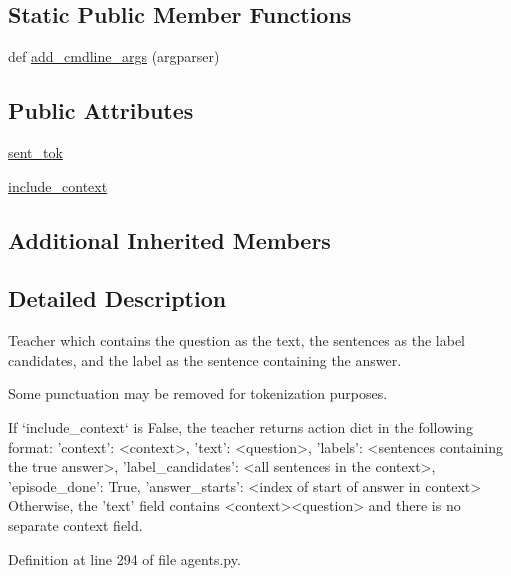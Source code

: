 \subsection*{Static Public Member Functions}
\begin{DoxyCompactItemize}
\item 
def \hyperlink{classparlai_1_1tasks_1_1squad_1_1agents_1_1FulldocsentenceTeacher_af4fae24533376a66d54c771b6c8d06b7}{add\+\_\+cmdline\+\_\+args} (argparser)
\end{DoxyCompactItemize}
\subsection*{Public Attributes}
\begin{DoxyCompactItemize}
\item 
\hyperlink{classparlai_1_1tasks_1_1squad_1_1agents_1_1FulldocsentenceTeacher_a3ad4365c2ebc8896e90e8b478eeb68ed}{sent\+\_\+tok}
\item 
\hyperlink{classparlai_1_1tasks_1_1squad_1_1agents_1_1FulldocsentenceTeacher_a1861bd0d07fa2488073e0292513187dc}{include\+\_\+context}
\end{DoxyCompactItemize}
\subsection*{Additional Inherited Members}


\subsection{Detailed Description}
\begin{DoxyVerb}Teacher which contains the question as the text, the sentences as the
label candidates, and the label as the sentence containing the answer.

Some punctuation may be removed for tokenization purposes.

If `include_context` is False, the teacher returns action dict in the
following format:
{
    'context': <context>,
    'text': <question>,
    'labels': <sentences containing the true answer>,
    'label_candidates': <all sentences in the context>,
    'episode_done': True,
    'answer_starts': <index of start of answer in context>
}
Otherwise, the 'text' field contains <context>\n<question> and there is
no separate context field.
\end{DoxyVerb}
 

Definition at line 294 of file agents.\+py.



